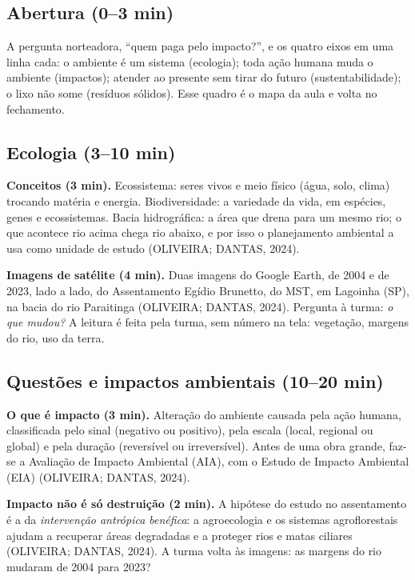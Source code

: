 \documentclass[11pt]{article}
\begin{document}
\subsection{Abertura (0--3 min)}
A pergunta norteadora, \enquote{quem paga pelo impacto?}, e os quatro eixos em uma linha cada: o ambiente é um
sistema (ecologia); toda ação humana muda o ambiente (impactos); atender ao presente sem tirar do futuro
(sustentabilidade); o lixo não some (resíduos sólidos). Esse quadro é o mapa da aula e volta no fechamento.

\subsection{Ecologia (3--10 min)}
\textbf{Conceitos (3 min).} Ecossistema: seres vivos e meio físico (água, solo, clima) trocando matéria e energia.
Biodiversidade: a variedade da vida, em espécies, genes e ecossistemas. Bacia hidrográfica: a área que drena para
um mesmo rio; o que acontece rio acima chega rio abaixo, e por isso o planejamento ambiental a usa como unidade de
estudo (OLIVEIRA; DANTAS, 2024).

\textbf{Imagens de satélite (4 min).} Duas imagens do Google Earth, de 2004 e de 2023, lado a lado, do
Assentamento Egídio Brunetto, do MST, em Lagoinha (SP), na bacia do rio Paraitinga (OLIVEIRA; DANTAS, 2024).
Pergunta à turma: \emph{o que mudou?} A leitura é feita pela turma, sem número na tela: vegetação, margens do rio,
uso da terra.

\subsection{Questões e impactos ambientais (10--20 min)}
\textbf{O que é impacto (3 min).} Alteração do ambiente causada pela ação humana, classificada pelo sinal
(negativo ou positivo), pela escala (local, regional ou global) e pela duração (reversível ou irreversível). Antes
de uma obra grande, faz-se a Avaliação de Impacto Ambiental (AIA), com o Estudo de Impacto Ambiental (EIA)
(OLIVEIRA; DANTAS, 2024).

\textbf{Impacto não é só destruição (2 min).} A hipótese do estudo no assentamento é a da \emph{intervenção
antrópica benéfica}: a agroecologia e os sistemas agroflorestais ajudam a recuperar áreas degradadas e a proteger
rios e matas ciliares (OLIVEIRA; DANTAS, 2024). A turma volta às imagens: as margens do rio mudaram de 2004 para 2023?
\end{document}

